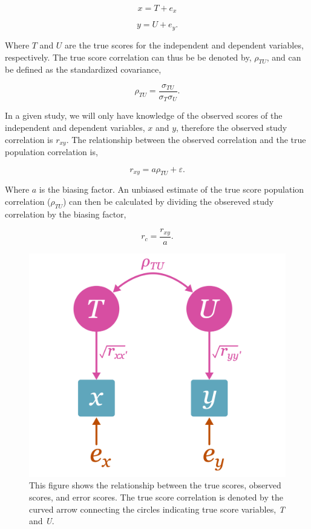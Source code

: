 \documentclass[
  letterpaper,
  DIV=11,
  numbers=noendperiod]{scrreprt}
\begin{document}
\[
x=T+e_x
\]

\[
y=U+e_y.
\]

Where \(T\) and \(U\) are the true scores for the independent and
dependent variables, respectively. The true score correlation can thus
be be denoted by, \(\rho_{TU}\), and can be defined as the standardized
covariance,

\[
\rho_{TU} = \frac{\sigma_{TU}}{\sigma_{T}\sigma_{U}}.
\]

In a given study, we will only have knowledge of the observed scores of
the independent and dependent variables, \(x\) and \(y\), therefore the
observed study correlation is \(r_{xy}\). The relationship between the
observed correlation and the true population correlation is,

\[
r_{xy} = a\rho_{TU} + \varepsilon.
\]

Where \(a\) is the biasing factor. An unbiased estimate of the true
score population correlation (\(\rho_{TU}\)) can then be calculated by
dividing the obsereved study correlation by the biasing factor,

\[
r_c = \frac{r_{xy}}{a}.
\]

\begin{figure}

{\centering \includegraphics{figure/diagram-estimand-reliability-r.png}

}

\caption{This figure shows the relationship between the true scores,
observed scores, and error scores. The true score correlation is denoted
by the curved arrow connecting the circles indicating true score
variables, \emph{T} and \emph{U}.}

\end{figure}
\end{document}
